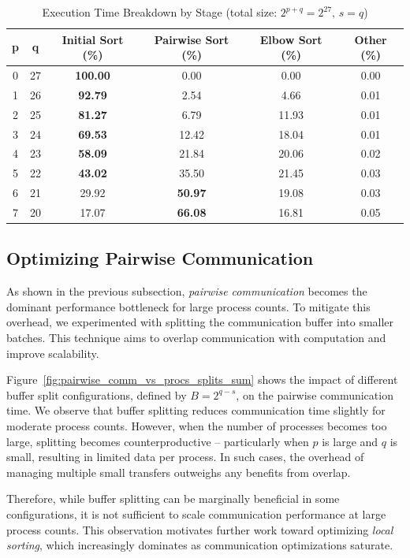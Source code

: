 \documentclass{article}
\begin{document}
\begin{table}[h]
\centering
\caption{Execution Time Breakdown by Stage (total size: $2^{p+q} = 2^{27},\, s = q$)}
\label{tab:time_breakdown}
\begin{tabular}{|c|c|c|c|c|c|}
\hline
\textbf{p} & \textbf{q} & \textbf{Initial Sort (\%)} & \textbf{Pairwise Sort (\%)} & 
\textbf{Elbow Sort (\%)} & \textbf{Other (\%)} \\
\hline
0 & 27 & \textbf{100.00} & 0.00 & 0.00 & 0.00 \\
1 & 26 & \textbf{92.79} & 2.54 & 4.66 & 0.01 \\
2 & 25 & \textbf{81.27} & 6.79 & 11.93 & 0.01 \\
3 & 24 & \textbf{69.53} & 12.42 & 18.04 & 0.01 \\
4 & 23 & \textbf{58.09} & 21.84 & 20.06 & 0.02 \\
5 & 22 & \textbf{43.02} & 35.50 & 21.45 & 0.03 \\
6 & 21 & 29.92 & \textbf{50.97} & 19.08 & 0.03 \\
7 & 20 & 17.07 & \textbf{66.08} & 16.81 & 0.05 \\
\hline
\end{tabular}
\end{table}

\subsection{Optimizing Pairwise Communication}

As shown in the previous subsection, \textit{pairwise communication} becomes the dominant performance bottleneck 
for large process counts. To mitigate this overhead, we experimented with splitting the communication buffer into
smaller batches. This technique aims to overlap communication with computation and improve scalability.

Figure~\ref{fig:pairwise_comm_vs_procs_splits_sum} shows the impact of different buffer split configurations, 
defined by $B = 2^{q-s}$, on the pairwise communication time. We observe that buffer splitting reduces 
communication time slightly for moderate process counts. However, when the number of processes becomes too large,
splitting becomes counterproductive -- particularly when $p$ is large and $q$ is small, resulting in limited data 
per process. In such cases, the overhead of managing multiple small transfers outweighs any benefits from overlap.

Therefore, while buffer splitting can be marginally beneficial in some configurations, it is not sufficient to 
scale communication performance at large process counts. This observation motivates further work toward optimizing
\textit{local sorting}, which increasingly dominates as communication optimizations saturate.
\end{document}
